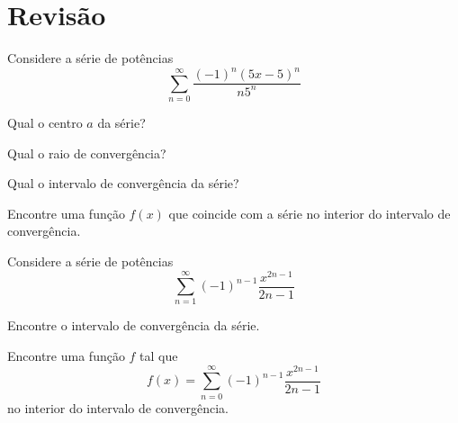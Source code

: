 \section{Revisão}

\begin{exercises*}

\begin{exercise}
  Considere a série de potências
  \[
    \sum_{n=0}^\infty \frac{(-1)^n(5x-5)^{n}}{n5^{n}}
  \]
  \vspace{-\baselineskip}
  \begin{alphalist}
    \item Qual o centro $a$ da série?
    \item Qual o raio de convergência?
    \item Qual o intervalo de convergência da série?
    \item Encontre uma função $f(x)$ que coincide com a série no interior do intervalo de convergência.
  \end{alphalist}
\end{exercise}

\begin{exercise}
  Considere a série de potências
  \[\sum_{n=1}^\infty (-1)^{n-1}\frac{x^{2n-1}}{2n-1}\]
  \begin{alphalist}
    \item Encontre o intervalo de convergência da série.
    \item Encontre uma função $f$ tal que
      \[ f(x)=\sum_{n=0}^\infty (-1)^{n-1}\frac{x^{2n-1}}{2n-1}\]
    no interior do intervalo de convergência.
  \end{alphalist}
\end{exercise}


\end{exercises*}
